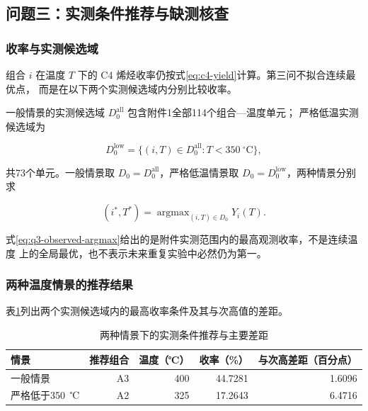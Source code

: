 \subsection{问题三：实测条件推荐与缺测核查}

\subsubsection{收率与实测候选域}

组合 \(i\) 在温度 \(T\) 下的 C4 烯烃收率仍按式\eqref{eq:c4-yield}计算。第三问不拟合连续最优点，
而是在以下两个实测候选域内分别比较收率。

一般情景的实测候选域 \(D_{0}^{\mathrm{all}}\) 包含附件1全部114个组合—温度单元；
严格低温实测候选域为

\begin{equation}
D_{0}^{\mathrm{low}}
=\{(i,T)\in D_{0}^{\mathrm{all}}:T<350~^\circ\mathrm{C}\},
\tag{19}
\label{eq:q3-domain}
\end{equation}

共73个单元。一般情景取 \(D_0=D_{0}^{\mathrm{all}}\)，严格低温情景取
\(D_0=D_{0}^{\mathrm{low}}\)，两种情景分别求

\begin{equation}
(i^*,T^*)=\mathop{\arg\max}_{(i,T)\in D_0}Y_i(T).
\tag{20}
\label{eq:q3-observed-argmax}
\end{equation}

式\eqref{eq:q3-observed-argmax}给出的是附件实测范围内的最高观测收率，不是连续温度
上的全局最优，也不表示未来重复实验中必然仍为第一。

\subsubsection{两种温度情景的推荐结果}

表\ref{tab:q3-recommendations}列出两个实测候选域内的最高收率条件及其与次高值的差距。
\begin{table}[H]
\centering
\caption{两种情景下的实测条件推荐与主要差距}
\label{tab:q3-recommendations}
\begin{tabular}{lrrrr}
\toprule
情景 & 推荐组合 & 温度（℃） & 收率（\%） & 与次高差距（百分点） \\
\midrule
一般情景 & A3 & 400 & 44.7281 & 1.6096 \\
严格低于350~℃ & A2 & 325 & 17.2643 & 6.4716 \\
\bottomrule
\end{tabular}
\end{table}

